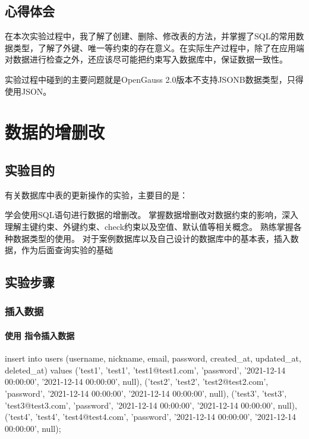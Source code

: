 \documentclass{ctexrep}
\begin{document}
\section{心得体会}
在本次实验过程中，我了解了创建、删除、修改表的方法，并掌握了SQL的常用数据类型，了解了外键、唯一等约束的存在意义。在实际生产过程中，除了在应用端对数据进行检查之外，还应该尽可能把约束写入数据库中，保证数据一致性。

实验过程中碰到的主要问题就是OpenGauss 2.0版本不支持JSONB数据类型，只得使用JSON。

\chapter{数据的增删改}
\section{实验目的}
有关数据库中表的更新操作的实验，主要目的是：
\begin{outline}[enumerate]
    \1 学会使用SQL语句进行数据的增删改。
    \1 掌握数据增删改对数据约束的影响，深入理解主键约束、外键约束、check约束以及空值、默认值等相关概念。
    \1 熟练掌握各种数据类型的使用。
    \1 对于案例数据库以及自己设计的数据库中的基本表，插入数据，作为后面查询实验的基础
\end{outline}

\section{实验步骤}
\subsection{插入数据}
\subsubsection{使用  指令插入数据}
\begin{run}
    \dt
    insert into users (username, nickname, email, password, created_at, updated_at, deleted_at) values 
    ('test1', 'test1', 'test1@test1.com', 'password', '2021-12-14 00:00:00', '2021-12-14 00:00:00', null),
    ('test2', 'test2', 'test2@test2.com', 'password', '2021-12-14 00:00:00', '2021-12-14 00:00:00', null),
    ('test3', 'test3', 'test3@test3.com', 'password', '2021-12-14 00:00:00', '2021-12-14 00:00:00', null),
    ('test4', 'test4', 'test4@test4.com', 'password', '2021-12-14 00:00:00', '2021-12-14 00:00:00', null);
\end{run}
\end{document}
